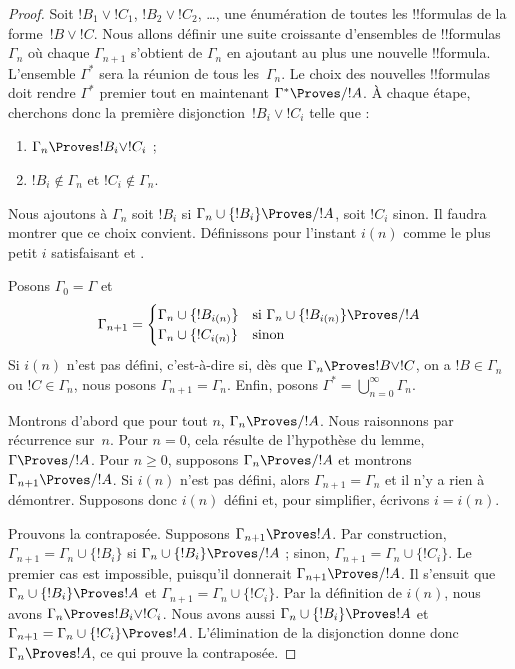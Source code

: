 \documentclass[../../../include/open-logic-section]{subfiles}
\begin{document}
\begin{proof}
  Soit $!B_1 \lor !C_1$, $!B_2 \lor !C_2$, \dots, une énumération
  de toutes les !!{formula}s de la forme~$!B \lor !C$. Nous allons
  définir une suite croissante d'ensembles de !!{formula}s~$\Gamma_n$
  où chaque $\Gamma_{n+1}$ s'obtient de $\Gamma_n$ en ajoutant au
  plus une nouvelle !!{formula}. L'ensemble $\Gamma^*$ sera la
  réunion de tous les~$\Gamma_n$. Le choix des nouvelles
  !!{formula}s doit rendre $\Gamma^*$ premier tout en maintenant
  $\Gamma^* \Proves/ !A$. À chaque étape, cherchons donc la première
  disjonction~$!B_i \lor !C_i$ telle que :
  \begin{enumerate}
  \item{} $\Gamma_n \Proves !B_i \lor !C_i$ ;
  \item{} $!B_i \notin \Gamma_n$ et
    $!C_i \notin \Gamma_n$.
  \end{enumerate}
  Nous ajoutons à $\Gamma_n$ soit $!B_i$ si
  $\Gamma_n \cup \{!B_i\} \Proves/ !A$, soit $!C_i$ sinon. Il faudra
  montrer que ce choix convient. Définissons pour l'instant $i(n)$
  comme le plus petit $i$ satisfaisant  et
  .

  Posons $\Gamma_0 = \Gamma$ et
  \[
  \Gamma_{n+1} = \begin{cases}
    \Gamma_n \cup \{!B_{i(n)}\} &
    \text{si $\Gamma_n \cup \{!B_{i(n)}\} \Proves/ !A$} \\
    \Gamma_n \cup \{!C_{i(n)}\} & \text{sinon}
    \end{cases}
  \]
  Si $i(n)$ n'est pas défini, c'est-à-dire si, dès que
  $\Gamma_n \Proves !B \lor !C$, on a $!B \in \Gamma_n$ ou
  $!C \in \Gamma_n$, nous posons $\Gamma_{n+1} = \Gamma_n$.
  Enfin, posons $\Gamma^* = \bigcup_{n=0}^\infty \Gamma_n$.

  Montrons d'abord que pour tout $n$, $\Gamma_n \Proves/ !A$.
  Nous raisonnons par récurrence sur~$n$. Pour $n = 0$, cela résulte
  de l'hypothèse du lemme, $\Gamma \Proves/ !A$. Pour $n\ge0$,
  supposons $\Gamma_n \Proves/ !A$ et montrons
  $\Gamma_{n+1} \Proves/ !A$. Si $i(n)$ n'est pas défini, alors
  $\Gamma_{n+1} = \Gamma_n$ et il n'y a rien à démontrer. Supposons
  donc $i(n)$ défini et, pour simplifier, écrivons $i = i(n)$.

  Prouvons la contraposée. Supposons $\Gamma_{n+1} \Proves !A$.
  Par construction, $\Gamma_{n+1} = \Gamma_n \cup \{!B_i\}$ si
  $\Gamma_n \cup \{!B_i\} \Proves/ !A$ ; sinon,
  $\Gamma_{n+1} = \Gamma_n \cup \{!C_i\}$. Le premier cas est
  impossible, puisqu'il donnerait $\Gamma_{n+1} \Proves/ !A$.
  Il s'ensuit que $\Gamma_n \cup \{!B_i\} \Proves !A$ et
  $\Gamma_{n+1} = \Gamma_n \cup \{!C_i\}$. Par la définition de
  $i(n)$, nous avons $\Gamma _n \Proves !B_i \lor !C_i$.
  Nous avons aussi $\Gamma_n \cup \{!B_i\} \Proves !A$ et
  $\Gamma_{n+1} = \Gamma_n \cup \{!C_i\} \Proves !A$.
  L'élimination de la disjonction donne donc $\Gamma_n \Proves !A$,
  ce qui prouve la contraposée.


\end{proof}
\end{document}
